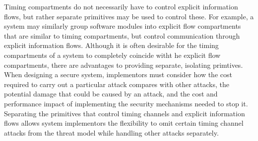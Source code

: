     Timing compartments do not necessarily have to control explicit information 
    flows, but rather separate primitives may be used to control these. For 
    example, a system may similarly group software modules into explicit flow 
    compartments that are similar to timing compartments, but control 
    communication through explicit information flows. Although it is often 
    desirable for the timing compartments of a system to completely coincide 
    witht he explicit flow compartments, there are advantages to providing 
    separate, isolating primtives. When designing a secure system, implementors 
    must consider how the cost required to carry out a particular attack 
    compares with other attacks, the potential damage that could be caused by 
    an attack, and the cost and performance impact of implementing the security 
    mechanisms needed to stop it. Separating the primitives that control timing 
    channels and explicit information flows allows system implementors the 
    flexibility to omit certain timing channel attacks from the threat model 
    while handling other attacks separately.
